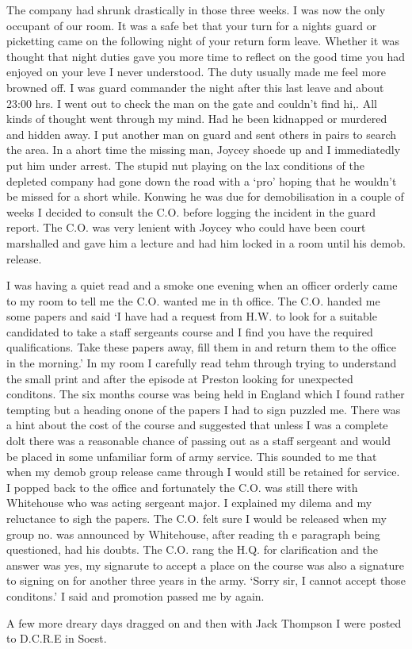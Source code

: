 The company had shrunk drastically in those three weeks. I was now the
only occupant of our room. It was a safe bet that your turn for a
nights guard or picketting came on the following night of your return
form leave. Whether it was thought that night duties gave you more
time to reflect on the good time you had enjoyed on your leve I never
understood. The duty usually made me feel more browned off. I was
guard commander the night after this last leave and about 23:00 hrs.
I went out to check the man on the gate and couldn't find hi,. All
kinds of thought went through my mind. Had he been kidnapped or
murdered and hidden away. I put another man on guard and sent others
in pairs to search the area. In a ahort time the missing man, \sapper
Joycey shoede up and I immediatedly put him under arrest. The stupid
nut playing on the lax conditions of the depleted company had gone
down the road with a `pro' hoping that he wouldn't be missed for a
short while. Konwing he was due for demobilisation in a couple of
weeks I decided to consult the C.O. before logging the incident in the
guard report. The C.O. was very lenient with Joycey who could have
been court marshalled and gave him a lecture and had him locked in a
room until his demob. release.

I was having a quiet read and a smoke one evening when an officer
orderly came to my room to tell me the C.O. wanted me in th
office. The C.O. handed me some papers and said `I have had a request
from H.W. to look for a suitable candidated to take a staff sergeants
course and I find you have the required qualifications. Take these
papers away, fill them in and return them to the office in the
morning.' In my room I carefully read tehm through trying to
understand the small print and after the episode at Preston looking
for unexpected conditons. The six months course was being held in
England which I found rather tempting but a heading onone of the
papers I had to sign puzzled me. There was a hint about the cost of
the course and suggested that unless I was a complete dolt there was a
reasonable chance of passing out as a staff sergeant and would be
placed in some unfamiliar form of army service. This sounded to me
that when my demob group release came through I would still be
retained for service. I popped back to the office and fortunately the
C.O. was still there with \sergeant Whitehouse who was acting sergeant
major. I explained my dilema and my reluctance to sigh the papers. The
C.O. felt sure I would be released when my group no. was announced by
\sergeant Whitehouse, after reading th e paragraph being questioned,
had his doubts. The C.O. rang the H.Q. for clarification and the
answer was yes, my signarute to accept a place on the course was also
a signature to signing on for another three years in the army. `Sorry
sir, I cannot accept those conditons.' I said and promotion passed me
by again.

A few more dreary days dragged on and then with \lcorporal Jack Thompson I
were posted to D.C.R.E in Soest.



